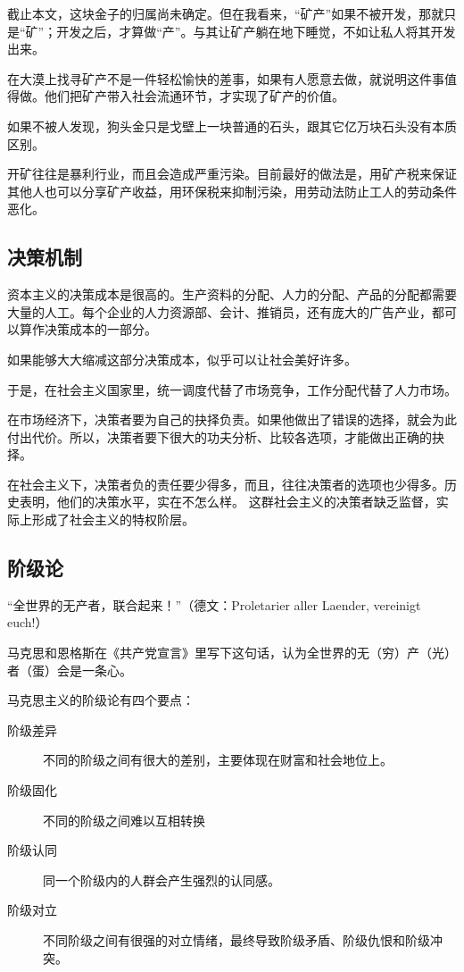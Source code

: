 截止本文，这块金子的归属尚未确定。但在我看来，“矿产”如果不被开发，那就只是“矿”；开发之后，才算做“产”。与其让矿产躺在地下睡觉，不如让私人将其开发出来。

在大漠上找寻矿产不是一件轻松愉快的差事，如果有人愿意去做，就说明这件事值得做。他们把矿产带入社会流通环节，才实现了矿产的价值。

如果不被人发现，狗头金只是戈壁上一块普通的石头，跟其它亿万块石头没有本质区别。

开矿往往是暴利行业，而且会造成严重污染。目前最好的做法是，用矿产税来保证其他人也可以分享矿产收益，用环保税来抑制污染，用劳动法防止工人的劳动条件恶化。

\subsection{决策机制}

资本主义的决策成本是很高的。生产资料的分配、人力的分配、产品的分配都需要大量的人工。每个企业的人力资源部、会计、推销员，还有庞大的广告产业，都可以算作决策成本的一部分。

如果能够大大缩减这部分决策成本，似乎可以让社会美好许多。

于是，在社会主义国家里，统一调度代替了市场竞争，工作分配代替了人力市场。

在市场经济下，决策者要为自己的抉择负责。如果他做出了错误的选择，就会为此付出代价。所以，决策者要下很大的功夫分析、比较各选项，才能做出正确的抉择。

在社会主义下，决策者负的责任要少得多，而且，往往决策者的选项也少得多。历史表明，他们的决策水平，实在不怎么样。
这群社会主义的决策者缺乏监督，实际上形成了社会主义的特权阶层。

\subsection{阶级论}

“全世界的无产者，联合起来！”（德文：Proletarier aller Laender, vereinigt euch!）

马克思和恩格斯在《共产党宣言》里写下这句话，认为全世界的无（穷）产（光）者（蛋）会是一条心。

马克思主义的阶级论有四个要点：
\begin{description}
\item[阶级差异] 不同的阶级之间有很大的差别，主要体现在财富和社会地位上。
\item[阶级固化] 不同的阶级之间难以互相转换
\item[阶级认同] 同一个阶级内的人群会产生强烈的认同感。
\item[阶级对立] 不同阶级之间有很强的对立情绪，最终导致阶级矛盾、阶级仇恨和阶级冲突。
\end{description}

